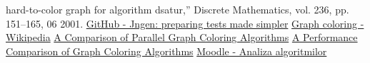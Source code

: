 \documentclass[runningheads]{paper}
\begin{document}
\begin{thebibliography}{8}
    hard-to-color graph for algorithm dsatur,” Discrete Mathematics, vol.
    236, pp. 151–165, 06 2001.
    \href{https://github.com/ifsmirnov/jngen}{GitHub - Jngen: preparing tests made simpler}
    \bibitem{}
    \href{https://en.wikipedia.org/wiki/Graph_coloring}{Graph coloring - Wikipedia}
    \bibitem{}
    \href{https://citeseerx.ist.psu.edu/document?repid=rep1&type=pdf&doi=203a7b17267a28a06808bfb3b0b9571e32d15503}{A Comparison of Parallel Graph Coloring Algorithms}
    \bibitem{}
    \href{https://dergipark.org.tr/en/download/article-file/254140}{A Performance Comparison of Graph Coloring Algorithms}
    \bibitem{}
    \href{https://curs.upb.ro/2022/mod/folder/view.php?id=77105}{Moodle - Analiza algoritmilor}
    \end{thebibliography}
\end{document}
